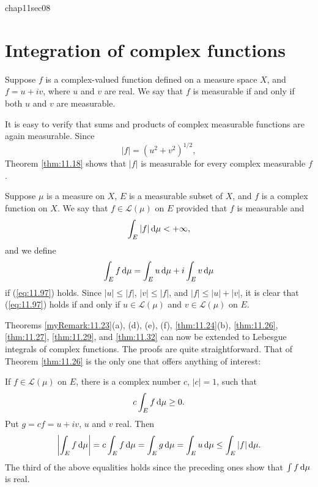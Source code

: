chap11sec08

\section{Integration of complex functions}

Suppose $f$ is a complex-valued function defined on a measure space $X$, 
and $f = u + iv$, 
where $u$ and $v$ are real. 
We say that $f$ is measurable if and only if
both $u$ and $v$ are measurable.

It is easy to verify that sums and products of complex measurable functions
are again measurable. Since
\begin{equation*}
    \left| f \right| = (u^2 + v^2)^{1/2},
\end{equation*}
Theorem \ref{thm:11.18} shows that $|f|$ is measurable for every complex measurable $f$.

Suppose $\mu$ is a measure on $X$, 
$E$ is a measurable subset of $X$, 
and $f$ is a complex function on $X$. 
We say that $f \in \mathscr{L}(\mu)$ on $E$ provided that $f$ is measurable
and 
\begin{equation}
    \label{eq:11.97}
    \int_E \left| f \right| \d \mu < +\infty ,
\end{equation}
and we define 
\begin{equation*}
    \int_E f \d \mu =
    \int_E u \d \mu + i
    \int_E v \d \mu
\end{equation*}
if (\ref{eq:11.97}) holds. 
Since $|u| \leq |f|$, $|v| \leq |f|$, and $|f | \leq | u | + | v |$, 
it is clear that
(\ref{eq:11.97}) holds if and only if $u \in \mathscr{L}(\mu)$ and $v \in \mathscr{L}(\mu)$ on $E$.

Theorems \ref{myRemark:11.23}(a), (d), (e), (f), \ref{thm:11.24}(b), \ref{thm:11.26}, \ref{thm:11.27}, \ref{thm:11.29}, and \ref{thm:11.32}
can now be extended to Lebesgue integrals of complex functions. 
The proofs are quite straightforward. 
That of Theorem \ref{thm:11.26} is the only one that offers
anything of interest:

If $f \in \mathscr{L}(\mu)$ on $E$, there is a complex number $c$, $|c| = 1$, such that 
\begin{equation*}
    c \int_E f \d \mu \geq 0 .
\end{equation*}
Put $g = cf = u + iv$, $u$ and $v$ real.
Then 
\begin{equation*}
    \left| \int_E f \d \mu \right| = 
    c \int_E f \d \mu =
    \int_E g \d \mu =
    \int_E u \d \mu \leq 
    \int_E | f | \d \mu .
\end{equation*}
The third of the above equalities holds since the preceding ones show that
$\int f \d \mu$ is real.
